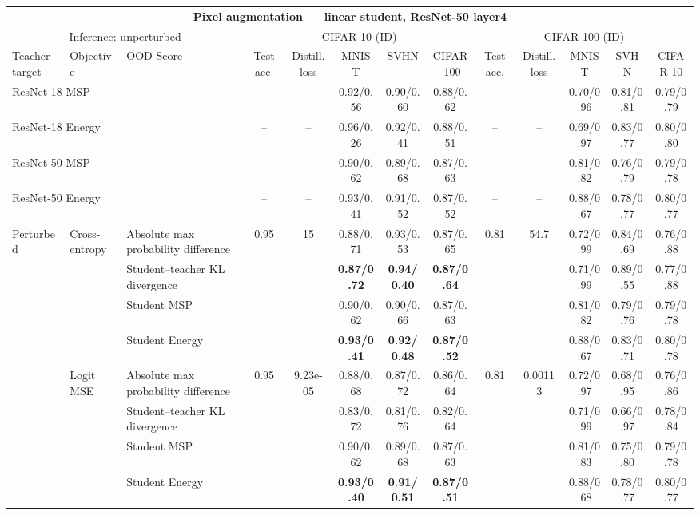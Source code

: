 \documentclass[border=2pt]{standalone}
\begin{document}
\scriptsize
\setlength{\tabcolsep}{3pt}
\begin{tabular}{lllcccccccccc}
\multicolumn{13}{c}{\textbf{Pixel augmentation --- linear student, ResNet-50 layer4}}\\[4pt]
\multicolumn{3}{c}{Inference: unperturbed} & \multicolumn{5}{c}{CIFAR-10 (ID)} & \multicolumn{5}{c}{CIFAR-100 (ID)} \\
\cmidrule(lr){4-8} \cmidrule(lr){9-13}
\toprule
Teacher target & Objective & OOD Score & Test acc. & Distill. loss & MNIST & SVHN & CIFAR-100 & Test acc. & Distill. loss & MNIST & SVHN & CIFAR-10 \\
\midrule
\multicolumn{3}{l}{ResNet-18 MSP} & -- & -- & 0.92/0.56 & 0.90/0.60 & 0.88/0.62 & -- & -- & 0.70/0.96 & 0.81/0.81 & 0.79/0.79 \\
\multicolumn{3}{l}{ResNet-18 Energy} & -- & -- & 0.96/0.26 & 0.92/0.41 & 0.88/0.51 & -- & -- & 0.69/0.97 & 0.83/0.77 & 0.80/0.80 \\
\multicolumn{3}{l}{ResNet-50 MSP} & -- & -- & 0.90/0.62 & 0.89/0.68 & 0.87/0.63 & -- & -- & 0.81/0.82 & 0.76/0.79 & 0.79/0.78 \\
\multicolumn{3}{l}{ResNet-50 Energy} & -- & -- & 0.93/0.41 & 0.91/0.52 & 0.87/0.52 & -- & -- & 0.88/0.67 & 0.78/0.77 & 0.80/0.77 \\
\midrule
Perturbed & Cross-entropy & Absolute max probability difference & 0.95 & 15 & 0.88/0.71 & 0.93/0.53 & 0.87/0.65 & 0.81 & 54.7 & 0.72/0.99 & 0.84/0.69 & 0.76/0.88 \\
 &  & Student--teacher KL divergence &  &  & \textbf{0.87/0.72} & \textbf{0.94/0.40} & \textbf{0.87/0.64} &  &  & 0.71/0.99 & 0.89/0.55 & 0.77/0.88 \\
 &  & Student MSP &  &  & 0.90/0.62 & 0.90/0.66 & 0.87/0.63 &  &  & 0.81/0.82 & 0.79/0.76 & 0.79/0.78 \\
 &  & Student Energy &  &  & \textbf{0.93/0.41} & \textbf{0.92/0.48} & \textbf{0.87/0.52} &  &  & 0.88/0.67 & 0.83/0.71 & 0.80/0.78 \\
\addlinespace
 & Logit MSE & Absolute max probability difference & 0.95 & 9.23e-05 & 0.88/0.68 & 0.87/0.72 & 0.86/0.64 & 0.81 & 0.00113 & 0.72/0.97 & 0.68/0.95 & 0.76/0.86 \\
 &  & Student--teacher KL divergence &  &  & 0.83/0.72 & 0.81/0.76 & 0.82/0.64 &  &  & 0.71/0.99 & 0.66/0.97 & 0.78/0.84 \\
 &  & Student MSP &  &  & 0.90/0.62 & 0.89/0.68 & 0.87/0.63 &  &  & 0.81/0.83 & 0.75/0.80 & 0.79/0.78 \\
 &  & Student Energy &  &  & \textbf{0.93/0.40} & \textbf{0.91/0.51} & \textbf{0.87/0.51} &  &  & 0.88/0.68 & 0.78/0.77 & 0.80/0.77 \\

\end{tabular}
\end{document}
